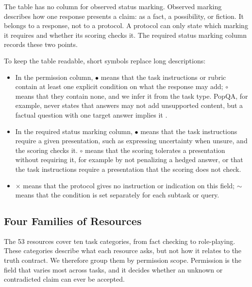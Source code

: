 \documentclass{clv2025}
\newcommand{\Stated}{\ensuremath{\bullet}}
\newcommand{\Weak}{\ensuremath{\circ}}
\newcommand{\Varies}{\ensuremath{\sim}}
\newcommand{\Lacks}{\ensuremath{\times}}
\begin{document}
The table has no column for observed status marking. Observed marking
describes how one response presents a claim: as a fact, a possibility, or
fiction. It belongs to a response, not to a protocol. A protocol can only
state which marking it requires and whether its scoring checks it.
The required status marking column records these two points.

To keep the table readable, short symbols replace long descriptions:
\begin{itemize}
\item In the permission column, \Stated{} means that the task instructions
or rubric contain at least one explicit condition on what the response may
add; \Weak{} means that they contain none, and we infer it from the task
type. PopQA, for example, never states that answers may not add unsupported
content, but a factual question with one target answer implies it
\citep{mallen_when_2023}.
\item In the required status marking column, \Stated{} means that the task
instructions require a given presentation, such as expressing uncertainty
when unsure, and the scoring checks it. \Weak{} means that the scoring
tolerates a presentation without requiring it, for example by not
penalizing a hedged answer, or that the task instructions require a
presentation that the scoring does not check.
\item \Lacks{} means that the protocol gives no instruction or indication
on this field; \Varies{} means that the condition is set separately for
each subtask or query.
\end{itemize}

\subsection{Four Families of Resources}\label{subsec:families}

The 53 resources cover ten task categories, from fact checking to
role-playing. These categories describe what each resource asks, but not
how it relates to the truth contract. We therefore group them by
permission scope. Permission is the field that varies most across tasks,
and it decides whether an unknown or contradicted claim can ever be
accepted.
\end{document}
